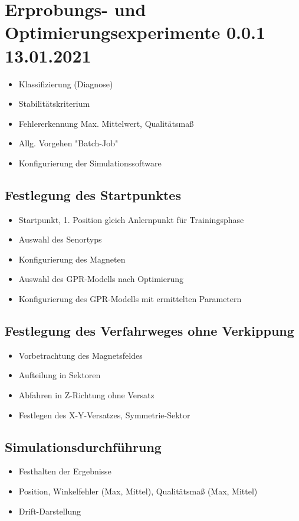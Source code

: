 %

\chapter{Erprobungs- und Optimierungsexperimente 0.0.1 13.01.2021}\label{ch:erprobungs-u-opt-exp}
	\begin{itemize}
		\item Klassifizierung (Diagnose)
		\item Stabilitätskriterium
		\item Fehlererkennung Max. Mittelwert, Qualitätsmaß
		\item Allg. Vorgehen "Batch-Job"
		\item Konfigurierung der Simulationssoftware
	\end{itemize}

\section{Festlegung des Startpunktes}\label{sec:festlegung-des-startpunktes}
	\begin{itemize}
		\item Startpunkt, 1. Position gleich Anlernpunkt für Trainingsphase
		\item Auswahl des Senortyps
		\item Konfigurierung des Magneten
		\item Auswahl des GPR-Modells nach Optimierung
		\item Konfigurierung des GPR-Modells mit ermittelten Parametern
	\end{itemize}




\section{Festlegung des Verfahrweges ohne Verkippung}\label{sec:festlegung-verfahrwe-ohne-verkippung}
	\begin{itemize}
		\item Vorbetrachtung des Magnetsfeldes 
		\item Aufteilung in Sektoren
		\item Abfahren in Z-Richtung ohne Versatz
		\item Festlegen des X-Y-Versatzes, Symmetrie-Sektor		
	\end{itemize}

\section{Simulationsdurchführung}\label{sec:simulationsdurchfuehrung}
	\begin{itemize}
		\item Festhalten der Ergebnisse
		\item Position, Winkelfehler (Max, Mittel), Qualitätsmaß (Max, Mittel)
		\item Drift-Darstellung
	\end{itemize}
	
